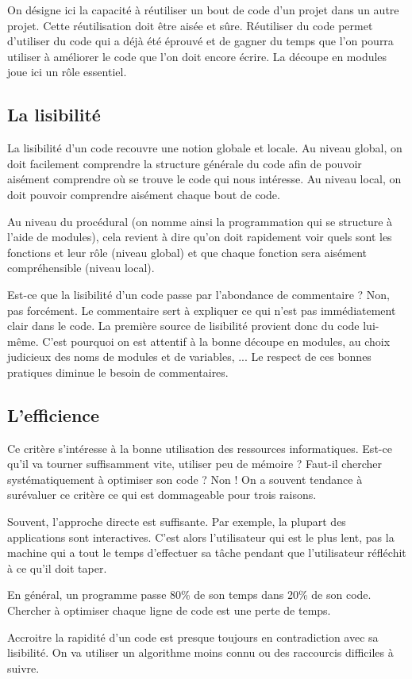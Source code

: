 	{
	On désigne ici la capacité à réutiliser un bout de code
	d'un projet dans un autre projet. Cette réutilisation
	doit être aisée et sûre. Réutiliser du code permet
	d'utiliser du code qui a déjà été éprouvé et de gagner
	du temps que l'on pourra utiliser à améliorer le code
	que l'on doit encore écrire. La découpe en modules
	joue ici un rôle essentiel.}

\subsection{La lisibilité}

	{
	La lisibilité d'un code recouvre une notion globale et
	locale. Au niveau global, on doit facilement comprendre la structure
	générale du code afin de pouvoir aisément comprendre où se trouve le
	code qui nous intéresse. Au niveau local, on doit pouvoir comprendre
	aisément chaque bout de code.}

	{
	Au niveau du procédural (on nomme ainsi la programmation qui se
	structure à l'aide de modules), cela revient à dire
	qu'on doit rapidement voir quels sont les fonctions et
	leur rôle (niveau global) et que chaque fonction sera aisément
	compréhensible (niveau local). }
	
	{
	Est-ce que la lisibilité d'un code passe par
	l'abondance de commentaire ? Non, pas forcément. Le
	commentaire sert à expliquer ce qui n'est pas
	immédiatement clair dans le code. La première source de lisibilité
	provient donc du code lui-même. C'est pourquoi on est
	attentif à la bonne découpe en modules, au choix judicieux des noms de
	modules et de variables, ... Le respect de ces bonnes pratiques diminue
	le besoin de commentaires.}
	
\subsection{L'efficience}

	{
	Ce critère s'intéresse à la bonne utilisation des
	ressources informatiques. Est-ce qu'il va tourner
	suffisamment vite, utiliser peu de mémoire ? Faut-il chercher
	systématiquement à optimiser son code ? Non ! On a souvent tendance à
	surévaluer ce critère ce qui est dommageable pour trois raisons.}

	\begin{liste}
	\item {
		Souvent, l'approche directe est suffisante. Par
		exemple, la plupart des applications sont interactives.
		C'est alors l’utilisateur qui est le plus lent, pas la
		machine qui a tout le temps d'effectuer sa tâche
		pendant que l’utilisateur réfléchit à ce qu'il doit
		taper.}
	\item {
		En général, un programme passe 80\% de son temps dans 20\% de son code.
		Chercher à optimiser chaque ligne de code est une perte de temps.}
	\item {
		Accroitre la rapidité d'un code est presque toujours en
		contradiction avec sa lisibilité. On va utiliser un algorithme moins
		connu ou des raccourcis difficiles à suivre.}
	\end{liste}

